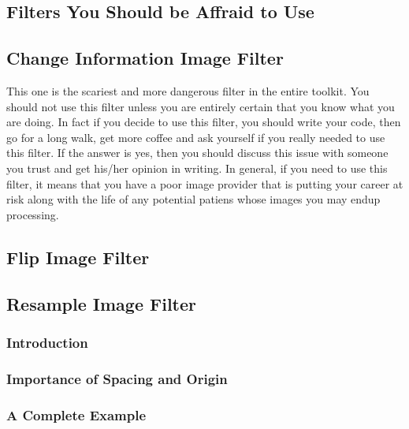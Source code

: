 \subsection{Filters You Should be Affraid to Use}

\label{sec:ScaryImageFilters}
\subsection{Change Information Image Filter}

This one is the scariest and more dangerous filter in the entire toolkit. You
should not use this filter unless you are entirely certain that you know what
you are doing. In fact if you decide to use this filter, you should write your
code, then go for a long walk, get more coffee and ask yourself if you really
needed to use this filter. If the answer is yes, then you should discuss this
issue with someone you trust and get his/her opinion in writing.  In general,
if you need to use this filter, it means that you have a poor image provider
that is putting your career at risk along with the life of any potential
patiens whose images you may endup processing.

\subsection{Flip Image Filter}

\ifitkFullVersion

\fi

\subsection{Resample Image Filter}
\label{sec:ResampleImageFilter}

\subsubsection{Introduction}

\ifitkFullVersion

\fi

\subsubsection{Importance of Spacing and Origin}
\ifitkFullVersion

\fi

\subsubsection{A Complete Example}
\ifitkFullVersion

\fi

